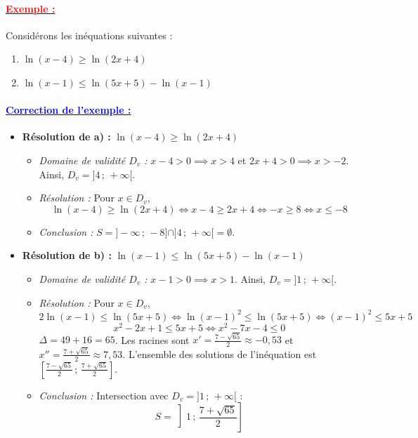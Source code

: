 \documentclass[12pt,a4paper]{article}
\newcounter{exemple}
\begin{document}
\paragraph{\underline{\textbf{\textcolor{red}{Exemple :}}}}
Considérons les inéquations suivantes :
\begin{enumerate}
    \item[a)] $\ln(x-4) \geq \ln(2x+4)$
    \item[b)] $\ln(x-1) \leq \ln(5x+5) - \ln(x-1)$
\end{enumerate}

\paragraph{\underline{\textbf{\textcolor{blue}{Correction de l'exemple :}}}}
\begin{itemize}
    \item \textbf{Résolution de a) :} $\ln(x-4) \geq \ln(2x+4)$
    \begin{itemize}
        \item \textit{Domaine de validité $D_v$ :} $x-4 > 0 \implies x > 4$ et $2x+4 > 0 \implies x > -2$. Ainsi, $D_v = ]4 \,;\, +\infty[$.
        \item \textit{Résolution :} Pour $x \in D_v$,
        \[
        \ln(x-4) \geq \ln(2x+4) \iff x-4 \geq 2x+4 \iff -x \geq 8 \iff x \leq -8
        \]
        \item \textit{Conclusion :} $S = ]-\infty \,;\, -8] \cap ]4 \,;\, +\infty[ = \emptyset$.
    \end{itemize}

    \item \textbf{Résolution de b) :} $\ln(x-1) \leq \ln(5x+5) - \ln(x-1)$
    \begin{itemize}
        \item \textit{Domaine de validité $D_v$ :} $x-1 > 0 \implies x > 1$. Ainsi, $D_v = ]1 \,;\, +\infty[$.
        \item \textit{Résolution :} Pour $x \in D_v$,
        \[
        2\ln(x-1) \leq \ln(5x+5) \iff \ln(x-1)^2 \leq \ln(5x+5) \iff (x-1)^2 \leq 5x+5
        \]
        \[
        x^2 - 2x + 1 \leq 5x + 5 \iff x^2 - 7x - 4 \leq 0
        \]
        $\Delta = 49 + 16 = 65$. Les racines sont $x' = \frac{7-\sqrt{65}}{2} \approx -0{,}53$ et $x'' = \frac{7+\sqrt{65}}{2} \approx 7{,}53$.
        L'ensemble des solutions de l'inéquation est $\left[\frac{7-\sqrt{65}}{2} \,;\, \frac{7+\sqrt{65}}{2}\right]$.
        \item \textit{Conclusion :} Intersection avec $D_v = ]1 \,;\, +\infty[$ :
        \[
        S = \left]1 \,;\, \frac{7+\sqrt{65}}{2}\right]
        \]
    \end{itemize}
\end{itemize}
\end{document}
